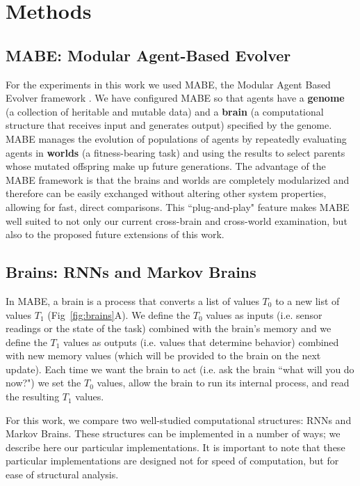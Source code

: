 \section{Methods}

\subsection{MABE: Modular Agent-Based Evolver}

For the experiments in this work we used MABE, the Modular Agent Based Evolver framework \citep{bohm_mabe_2017}. 
We have configured MABE so that agents have a \textbf{genome} (a collection of heritable and mutable data) and a \textbf{brain} (a computational structure that receives input and generates output) specified by the genome. 
MABE manages the evolution of populations of agents by repeatedly evaluating agents in \textbf{worlds} (a fitness-bearing task) and using the results to select parents whose mutated offspring make up future generations. 
The advantage of the MABE framework is that the brains and worlds are completely modularized and therefore can be easily exchanged without altering other system properties, allowing for fast, direct comparisons. 
This ``plug-and-play" feature makes MABE well suited to not only our current cross-brain and cross-world examination, but also to the proposed future extensions of this work.

\subsection{Brains: RNNs and Markov Brains}

In MABE, a brain is a process that converts a list of values \textit{$T_0$} to a new list of values \textit{$T_1$} (Fig~\ref{fig:brains}A). 
We define the $T_0$ values as inputs (i.e. sensor readings or the state of the task) combined with the brain's memory and we define the $T_1$ values as outputs (i.e. values that determine behavior) combined with new memory values (which will be provided to the brain on the next update). 
Each time we want the brain to act (i.e. ask the brain ``what will you do now?") we set the $T_0$ values, allow the brain to run its internal process, and read the resulting $T_1$ values. 

For this work, we compare two well-studied computational structures: RNNs and Markov Brains. 
These structures can be implemented in a number of ways; we describe here our particular implementations. 
It is important to note that these particular implementations are designed not for speed of computation, but for ease of structural analysis.

